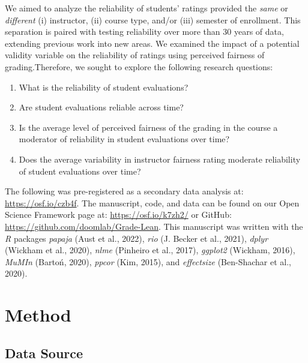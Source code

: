 \documentclass[
  man]{apa7}
\providecommand{\tightlist}{%
  \setlength{\itemsep}{0pt}\setlength{\parskip}{0pt}}
\begin{document}
We aimed to analyze the reliability of students' ratings provided the \emph{same} or \emph{different} (i) instructor, (ii) course type, and/or (iii) semester of enrollment. This separation is paired with testing reliability over more than 30 years of data, extending previous work into new areas. We examined the impact of a potential validity variable on the reliability of ratings using perceived fairness of grading.Therefore, we sought to explore the
following research questions:

\begin{enumerate}
\def\labelenumi{\arabic{enumi})}
\tightlist
\item
  What is the reliability of student evaluations?
\item
  Are student evaluations reliable across time?
\item
  Is the average level of perceived fairness of the grading in the
  course a moderator of reliability in student evaluations over time?
\item
  Does the average variability in instructor fairness rating moderate
  reliability of student evaluations over time?
\end{enumerate}

The following was pre-registered as a secondary data analysis at:
\url{https://osf.io/czb4f}. The manuscript, code, and data can be found on
our Open Science Framework page at: \url{https://osf.io/k7zh2/} or GitHub:
\url{https://github.com/doomlab/Grade-Lean}. This manuscript was written
with the \emph{R} packages \emph{papaja} (Aust et al., 2022), \emph{rio} (J. Becker et al., 2021), \emph{dplyr}
(Wickham et al., 2020), \emph{nlme} (Pinheiro et al., 2017), \emph{ggplot2} (Wickham, 2016), \emph{MuMIn}
(Bartoń, 2020), \emph{ppcor} (Kim, 2015), and \emph{effectsize} (Ben-Shachar et al., 2020).

\section{Method}\label{method}

\subsection{Data Source}\label{data-source}
\end{document}
